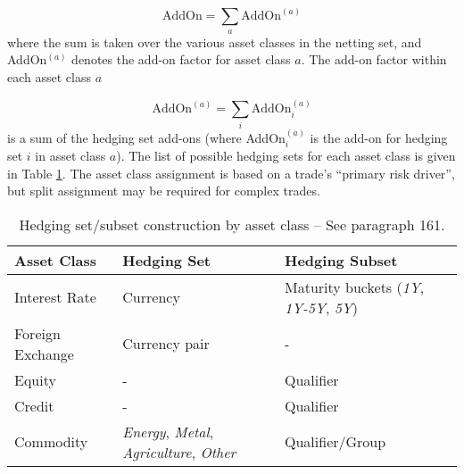 \begin{equation*}
\text{AddOn} = \sum_a \text{AddOn}^{(a)}
\end{equation*}
where the sum is taken over the various asset classes in the netting
set, and AddOn$^{(a)}$ denotes the add-on factor for asset class $a$.
The add-on factor within each asset class $a$

\begin{equation}\label{sa-ccr-addon}
\text{AddOn}^{(a)} = \sum_i \text{AddOn}^{(a)}_i
\end{equation}
is a sum of the hedging set add-ons (where AddOn$^{(a)}_i$ is the add-on for hedging set $i$ in asset class $a$).
The list of possible hedging sets for each asset class is given in Table \ref{tab:hedgingset}. The asset class
assignment is based on a trade's ``primary risk driver'', but split assignment may be required for complex trades.

{
\begin{table}[hbt]
\begin{center}
\scriptsize
\begin{tabular}{|l|p{5cm}|p{5cm}|}
\hline
Asset Class & Hedging Set & Hedging Subset \\
\hline
\hline
Interest Rate & Currency & Maturity buckets (\emph{1Y}, \emph{1Y-5Y}, \emph{5Y})\\
\hline
Foreign Exchange & Currency pair & - \\
\hline
Equity & - & Qualifier \\
\hline
Credit & - & Qualifier \\
\hline
Commodity & \emph{Energy}, \emph{Metal}, \emph{Agriculture}, \emph{Other} & Qualifier/Group \\
\hline
\end{tabular}
\caption{Hedging set/subset construction by asset class -- See \cite{bcbs279} paragraph 161.}
\label{tab:hedgingset}
\end{center}
\end{table}
}

